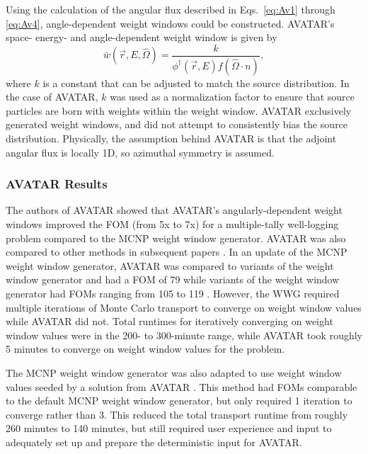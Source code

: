 Using the calculation of the angular flux described in Eqs.\ \eqref{eq:Av1}
through \eqref{eq:Av4}, angle-dependent weight windows could be constructed.
AVATAR's space- energy- and angle-dependent weight window is given by
\begin{equation}
\bar {w} (\vec{r},E,\hat\Omega) = \frac{k}{\phi^{\dagger}(\vec{r},E)
                                  f(\hat\Omega \cdot n)},
\end{equation}
where $k$ is a constant that can be adjusted to match the source distribution.
In the case of AVATAR, $k$ was used as a normalization factor to ensure that
source particles are born with weights within the weight window.
AVATAR exclusively generated weight windows, and did not attempt to consistently
bias the source
distribution. Physically, the assumption behind AVATAR is that the adjoint
angular flux
is locally 1D, so azimuthal symmetry is assumed.

\subsubsection*{AVATAR Results}

The authors of AVATAR showed that AVATAR's angularly-dependent
weight windows improved the FOM (from 5x to 7x) for a multiple-tally well-logging
problem compared to the MCNP weight window generator. AVATAR was also compared
to other methods in subsequent papers \cite{evans_enhanced_1998}. In an
update of the MCNP weight window generator, AVATAR was compared to variants of
the weight window generator and had a FOM of 79 while variants of the
weight window generator had FOMs ranging from 105 to 119
\cite{evans_enhanced_1998}. However, the WWG required
multiple iterations of Monte Carlo transport to converge on weight window values
while AVATAR did not. Total runtimes for iteratively converging on weight window
values were in the 200- to 300-minute range, while AVATAR took roughly 5
minutes to converge on weight window values for the problem.

The MCNP weight window generator was also adapted to use weight window
values seeded by a solution from AVATAR \cite{evans_enhanced_1998}. This method
had FOMs comparable to the default MCNP weight window generator, but only
required 1 iteration to converge rather than 3. This reduced the total
transport runtime from roughly 260 minutes to 140 minutes, but still required
user experience and input to adequately set up and prepare the deterministic
input for AVATAR.

